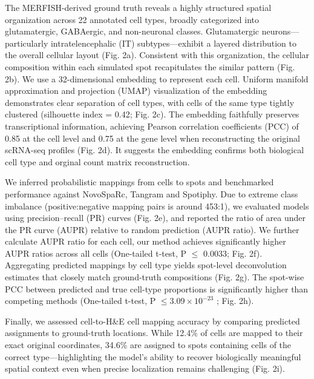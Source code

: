 \documentclass[10pt,a4paper]{article}
\begin{document}
The MERFISH-derived ground truth reveals a highly structured spatial organization across 22 annotated cell types, broadly categorized into glutamatergic, GABAergic, and non-neuronal classes. Glutamatergic neurons---particularly intratelencephalic (IT) subtypes---exhibit a layered distribution to the overall cellular layout (Fig. 2a). Consistent with this organization, the cellular composition within each simulated spot recapitulates the similar pattern (Fig. 2b). We use a 32-dimensional embedding to represent each cell. Uniform manifold approximation and projection (UMAP) visualization of the embedding demonstrates clear separation of cell types, with cells of the same type tightly clustered (silhouette index = 0.42; Fig. 2c). The embedding faithfully preserves transcriptional information, achieving Pearson correlation coefficients (PCC) of 0.85 at the cell level and 0.75 at the gene level when reconstructing the original scRNA-seq profiles (Fig. 2d). It suggests the embedding confirms both biological cell type and orginal count matrix reconstruction.

We inferred probabilistic mappings from cells to spots and benchmarked performance against NovoSpaRc, Tangram and Spotiphy. Due to extreme class imbalance (positive:negative mapping pairs is around 453:1), we evaluated models using precision--recall (PR) curves (Fig. 2e), and reported the ratio of area under the PR curve (AUPR) relative to random prediction (AUPR ratio). We further calculate AUPR ratio for each cell, our method achieves significantly higher AUPR ratios across all cells (One-tailed t-test, P $\leq$ 0.0033; Fig. 2f). Aggregating predicted mappings by cell type yields spot-level deconvolution estimates that closely match ground-truth compositions (Fig. 2g). The spot-wise PCC between predicted and true cell-type proportions is significantly higher than competing methods (One-tailed t-test, P $\leq3.09\times 10^{-23}$ ; Fig. 2h).

Finally, we assessed cell-to-H\&E cell mapping accuracy by comparing predicted assignments to ground-truth locations. While 12.4\% of cells are mapped to their exact original coordinates, 34.6\% are assigned to spots containing cells of the correct type---highlighting the model's ability to recover biologically meaningful spatial context even when precise localization remains challenging (Fig. 2i).
\end{document}
